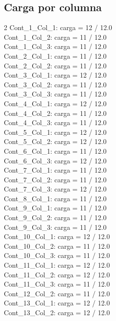 \subsection*{Carga por columna}
\begin{multicols}{2}
\scriptsize
\noindent
Cont\_1\_Col\_1: carga = 12 / 12.0\\
Cont\_1\_Col\_2: carga = 11 / 12.0\\
Cont\_1\_Col\_3: carga = 11 / 12.0\\
Cont\_2\_Col\_1: carga = 11 / 12.0\\
Cont\_2\_Col\_2: carga = 11 / 12.0\\
Cont\_3\_Col\_1: carga = 12 / 12.0\\
Cont\_3\_Col\_2: carga = 11 / 12.0\\
Cont\_3\_Col\_3: carga = 11 / 12.0\\
Cont\_4\_Col\_1: carga = 12 / 12.0\\
Cont\_4\_Col\_2: carga = 11 / 12.0\\
Cont\_4\_Col\_3: carga = 11 / 12.0\\
Cont\_5\_Col\_1: carga = 12 / 12.0\\
Cont\_5\_Col\_2: carga = 12 / 12.0\\
Cont\_6\_Col\_1: carga = 11 / 12.0\\
Cont\_6\_Col\_3: carga = 12 / 12.0\\
Cont\_7\_Col\_1: carga = 11 / 12.0\\
Cont\_7\_Col\_2: carga = 11 / 12.0\\
Cont\_7\_Col\_3: carga = 12 / 12.0\\
Cont\_8\_Col\_1: carga = 11 / 12.0\\
Cont\_9\_Col\_1: carga = 11 / 12.0\\
Cont\_9\_Col\_2: carga = 11 / 12.0\\
Cont\_9\_Col\_3: carga = 11 / 12.0\\
Cont\_10\_Col\_1: carga = 12 / 12.0\\
Cont\_10\_Col\_2: carga = 11 / 12.0\\
Cont\_10\_Col\_3: carga = 11 / 12.0\\
Cont\_11\_Col\_1: carga = 12 / 12.0\\
Cont\_11\_Col\_2: carga = 12 / 12.0\\
Cont\_11\_Col\_3: carga = 11 / 12.0\\
Cont\_12\_Col\_2: carga = 11 / 12.0\\
Cont\_13\_Col\_1: carga = 12 / 12.0\\
Cont\_13\_Col\_2: carga = 12 / 12.0\\

\end{multicols}
